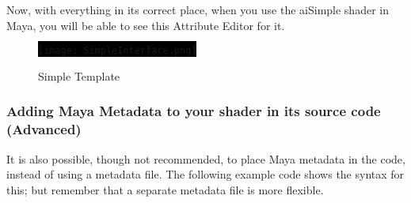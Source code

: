 Now, with everything in its correct place, when you use the aiSimple shader in Maya, you will be able to see this Attribute Editor for it.

\begin{figure}[H]
\centering
\colorbox{black}{\texttt{[image: SimpleInterface.png]}}
\caption{Simple Template}
\label{SimpleTemplate}
\end{figure}

\subsubsection{Adding Maya Metadata to your shader in its source code (Advanced)}

It is also possible, though not recommended, to place Maya metadata
in the code, instead of using a metadata file. The following example
code shows the syntax for this; but remember that
a separate metadata file is more flexible.

\inputminted[mathescape,
numbersep=5pt,
frame=lines,
framesep=2mm,
baselinestretch=1,
fontsize=\footnotesize,
tabsize=3,
label=mayaShader.cpp,
firstline=9,
lastline=20]
{cpp}{mayaShader.cpp}
